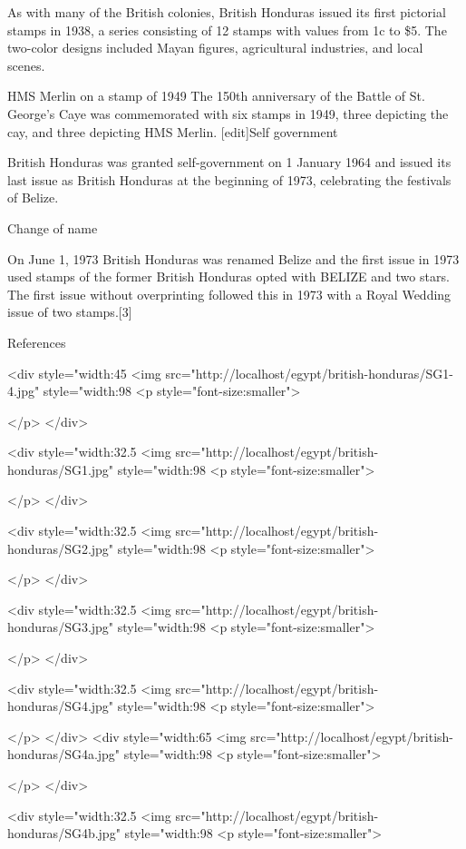 As with many of the British colonies, British Honduras issued its first pictorial stamps in 1938, a series consisting of 12 stamps with values from 1c to \$5. The two-color designs included Mayan figures, agricultural industries, and local scenes.


HMS Merlin on a stamp of 1949
The 150th anniversary of the Battle of St. George's Caye was commemorated with six stamps in 1949, three depicting the cay, and three depicting HMS Merlin.
[edit]Self government

British Honduras was granted self-government on 1 January 1964 and issued its last issue as British Honduras at the beginning of 1973, celebrating the festivals of Belize.

Change of name

On June 1, 1973 British Honduras was renamed Belize and the first issue in 1973 used stamps of the former British Honduras opted with BELIZE and two stars. The first issue without overprinting followed this in 1973 with a Royal Wedding issue of two stamps.[3]

References

<div style="width:45%
<img src="http://localhost/egypt/british-honduras/SG1-4.jpg" style="width:98%
<p style="font-size:smaller"> 

</p>
</div>


<div style="width:32.5%
<img src="http://localhost/egypt/british-honduras/SG1.jpg" style="width:98%
<p style="font-size:smaller"> 

</p>
</div>

<div style="width:32.5%
<img src="http://localhost/egypt/british-honduras/SG2.jpg" style="width:98%
<p style="font-size:smaller"> 

</p>
</div>

<div style="width:32.5%
<img src="http://localhost/egypt/british-honduras/SG3.jpg" style="width:98%
<p style="font-size:smaller"> 

</p>
</div>

<div style="width:32.5%
<img src="http://localhost/egypt/british-honduras/SG4.jpg" style="width:98%
<p style="font-size:smaller"> 

</p>
</div>
<div style="width:65%
<img src="http://localhost/egypt/british-honduras/SG4a.jpg" style="width:98%
<p style="font-size:smaller"> 

</p>
</div>

<div style="width:32.5%
<img src="http://localhost/egypt/british-honduras/SG4b.jpg" style="width:98%
<p style="font-size:smaller"> 


